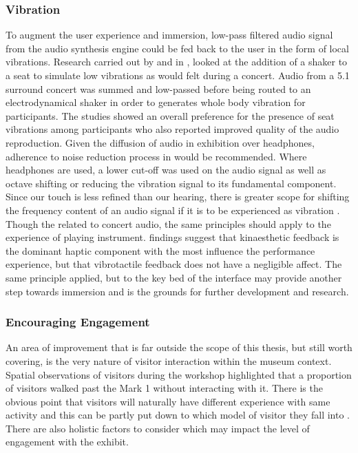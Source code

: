\subsubsection{Vibration}

To augment the user experience and immersion, low-pass filtered audio signal
from the audio synthesis engine could be fed back to the user in the form of
local vibrations. Research carried out by \textcite{merchel_vibratory_2009} and
in \textcite{merchel_functional_2018}, looked at the addition of a shaker to a
seat to simulate low vibrations as would felt during a concert. Audio from a 5.1
surround concert was summed and low-passed before being routed to an
electrodynamical shaker in order to generates whole body vibration for
participants. The studies showed an overall preference for the presence of seat
vibrations among participants who also reported improved quality of the audio
reproduction. Given the diffusion of audio in exhibition over headphones,
adherence to noise reduction process in \textcite{merchel_functional_2018} would
be recommended. Where headphones are used, a lower cut-off was used on the audio
signal as well as octave shifting or reducing the vibration signal to its
fundamental component. Since our touch is less refined than our hearing, there
is greater scope for shifting the frequency content of an audio signal if it is
to be experienced as vibration \cite{summers_single_2000}. Though the
\textcite{merchel_functional_2018} related to concert audio, the same principles
should apply to the experience of playing instrument. \citep{young_musical_2018}
findings suggest that kinaesthetic feedback is the dominant haptic component
with the most influence the performance experience, but that vibrotactile
feedback does not have a negligible affect. The same principle applied, but to
the key bed of the interface may provide another step towards immersion and is
the grounds for further development and research.

\subsubsection{Encouraging Engagement}

An area of improvement that is far outside the scope of this thesis, but still
worth covering, is the very nature of visitor interaction within the museum
context. Spatial observations of visitors during the workshop highlighted that a
proportion of visitors walked past the Mark 1 without interacting with it. There
is the obvious point that visitors will naturally have different experience with
same activity \cite{dorph_visitor_2019} and this can be partly put down to which
model of visitor they fall into \cite{templeton_museum_2018}. There are also
holistic factors to consider which may impact the level of engagement with the
exhibit.

